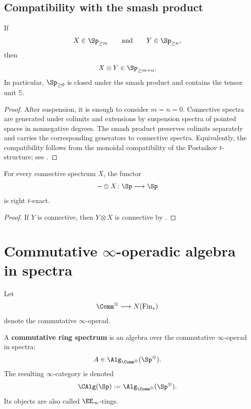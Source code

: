 \subsection{Compatibility with the smash product}

\begin{proposition}
\label{prop:smash-product-connectivity}
If
\[
    X\in\Sp_{\geq m}
    \qquad\text{and}\qquad
    Y\in\Sp_{\geq n},
\]
then
\[
    X\otimes Y
    \in
    \Sp_{\geq m+n}.
\]
In particular, $\Sp_{\geq0}$ is closed under the smash product and contains
the tensor unit $\mathbb S$.
\end{proposition}

\begin{proof}
After suspension, it is enough to consider $m=n=0$. Connective spectra are
generated under colimits and extensions by suspension spectra of pointed
spaces in nonnegative degrees. The smash product preserves colimits
separately and carries the corresponding generators to connective
spectra. Equivalently, the compatibility follows from the monoidal
compatibility of the Postnikov $t$-structure; see
\cite{LurieHigherAlgebra}.
\end{proof}

\begin{corollary}
\label{cor:connective-tensor-right-t-exact}
For every connective spectrum $X$, the functor
\[
    -\otimes X
    \colon
    \Sp
    \longrightarrow
    \Sp
\]
is right $t$-exact.
\end{corollary}

\begin{proof}
If $Y$ is connective, then $Y\otimes X$ is connective by
.
\end{proof}

\section{Commutative \texorpdfstring{$\infty$}{infinity}-operadic algebra
in spectra}
\label{sec:commutative-operadic-spectral-algebra}

Let
\[
    \Comm^\otimes
    \longrightarrow
    N(\mathrm{Fin}_*)
\]
denote the commutative $\infty$-operad.

\begin{definition}
\label{def:commutative-ring-spectrum}
A \textbf{commutative ring spectrum} is an algebra over the commutative
$\infty$-operad in spectra:
\[
    A
    \in
    \Alg_{\Comm^\otimes}(\Sp^\otimes).
\]
The resulting $\infty$-category is denoted
\[
    \CAlg(\Sp)
    :=
    \Alg_{\Comm^\otimes}(\Sp^\otimes).
\]
Its objects are also called $\EE_\infty$-rings.
\end{definition}

